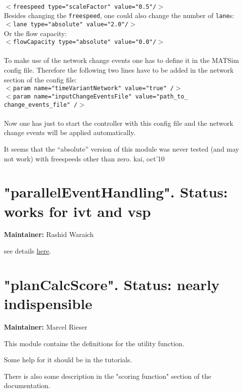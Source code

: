 \documentclass[a4paper,11pt]{report}
\begin{document}
\\   
\texttt{$<$freespeed type="scaleFactor" value="0.5"/$>$}
\\  Besides changing the 
\texttt{freespeed}, one could also change the number of 
\texttt{lane}s:
\\   
\texttt{$<$lane type="absolute" value="2.0"/$>$}
\\  Or the flow capacity:
\\   
\texttt{$<$flowCapacity type="absolute" value="0.0"/$>$}
\\
\\  To make use of the network change events one has to define it in the  MATSim config file. Therefore the following two lines have to be added  in the network section of the config file:
\\
\texttt{$<$param name="timeVariantNetwork" value="true" /$>$
\\  $<$param name="inputChangeEventsFile" value="path\_to\_ change\_events\_file" /$>$}
\\
\\  Now one has just to start the controller with this config file and the network change events will be applied automatically.

It  seems that the ``absolute'' version of this module was never tested (and  may not work) with freespeeds other than zero. kai, oct'10



\vfill\eject
\section{"parallelEventHandling". Status: works for ivt and vsp}

\textbf{Maintainer:} Rashid Waraich

see details \href{http://matsim.org/node/238}{here}.



\vfill\eject
\section{"planCalcScore". Status: nearly indispensible}

\textbf{Maintainer:} Marcel Rieser

This module contains the definitions for the utility function.

Some help for it should be in the tutorials.

There is also some description in the "scoring function" section of the documentation.
\end{document}
